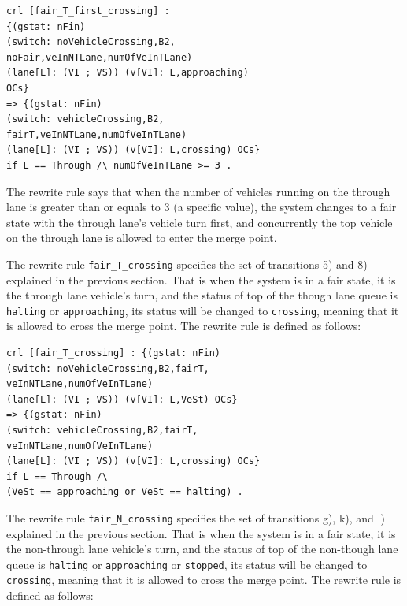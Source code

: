 \documentclass[10pt, conference, compsocconf]{IEEEtran}
\begin{document}
\begin{small}
\begin{verbatim}
crl [fair_T_first_crossing] : 
{(gstat: nFin) 
(switch: noVehicleCrossing,B2,
noFair,veInNTLane,numOfVeInTLane) 
(lane[L]: (VI ; VS)) (v[VI]: L,approaching) 
OCs} 
=> {(gstat: nFin) 
(switch: vehicleCrossing,B2,
fairT,veInNTLane,numOfVeInTLane) 
(lane[L]: (VI ; VS)) (v[VI]: L,crossing) OCs} 
if L == Through /\ numOfVeInTLane >= 3 .
\end{verbatim}
\end{small}

\noindent
The rewrite rule says that when the number of vehicles running on the through lane is greater than or equals to 3 (a specific value), the system changes to a fair state with the through lane's vehicle turn first, and concurrently the top vehicle on the through lane is allowed to enter the merge point.

The rewrite rule \verb!fair_T_crossing! specifies the set of transitions 5) and 8) explained in the previous section.
That is when the system is in a fair state, it is the through lane vehicle's turn, and the status of top of the though lane queue is \verb!halting! or \verb!approaching!, its status will be changed to \verb!crossing!, meaning that it is allowed to cross the merge point.
The rewrite rule is defined as follows:

\begin{small}
\begin{verbatim}
crl [fair_T_crossing] : {(gstat: nFin)
(switch: noVehicleCrossing,B2,fairT,
veInNTLane,numOfVeInTLane)
(lane[L]: (VI ; VS)) (v[VI]: L,VeSt) OCs} 
=> {(gstat: nFin) 
(switch: vehicleCrossing,B2,fairT,
veInNTLane,numOfVeInTLane) 
(lane[L]: (VI ; VS)) (v[VI]: L,crossing) OCs} 
if L == Through /\ 
(VeSt == approaching or VeSt == halting) .
\end{verbatim}
\end{small}

The rewrite rule \verb!fair_N_crossing! specifies the set of transitions g), k), and l) explained in the previous section.
That is when the system is in a fair state, it is the non-through lane vehicle's turn, and the status of top of the non-though lane queue is \verb!halting! or \verb!approaching! or \verb!stopped!, its status will be changed to \verb!crossing!, meaning that it is allowed to cross the merge point.
The rewrite rule is defined as follows:
\end{document}
